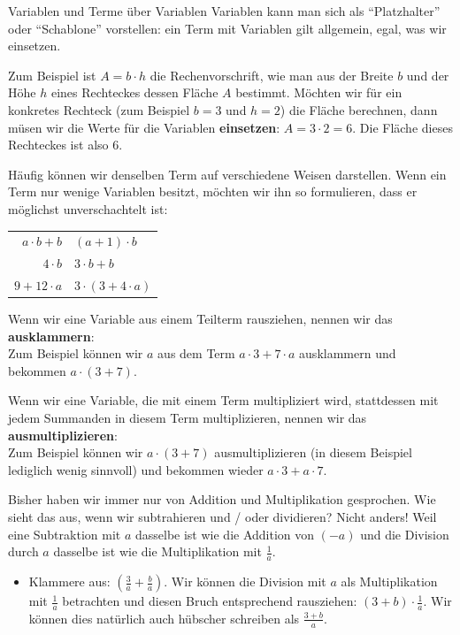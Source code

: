 \documentclass[../../main.tex]{subfiles}
\begin{document}
	\begin{nutshell}{Variablen und Terme über Variablen}
		Variablen kann man sich als \enquote{Platzhalter} oder \enquote{Schablone} vorstellen: ein Term mit Variablen gilt allgemein, egal, was wir einsetzen.

		Zum Beispiel ist $A = b\cdot h$ die Rechenvorschrift, wie man aus der Breite $b$ und der Höhe $h$ eines Rechteckes dessen Fläche $A$ bestimmt.
		Möchten wir für ein konkretes Rechteck (zum Beispiel $b=3$ und $h=2$) die Fläche berechnen, dann müsen wir die Werte für die Variablen \textbf{einsetzen}:
		$A = 3\cdot 2 = 6$. Die Fläche dieses Rechteckes ist also $6$.

		Häufig können wir denselben Term auf verschiedene Weisen darstellen. Wenn ein Term nur wenige Variablen besitzt, möchten wir ihn so formulieren,
		dass er möglichst unverschachtelt ist:
		\begin{center}
			\begin{tabular}{r@{ statt }l}
				$a\cdot b + b$ & $(a+1)\cdot b$\\
				$4\cdot b$ & $3\cdot b + b$\\
				$9+12\cdot a$ & $3\cdot (3 + 4\cdot a)$
			\end{tabular}
		\end{center}

		Wenn wir eine Variable aus einem Teilterm rausziehen, nennen wir das \textbf{ausklammern}:\\
		Zum Beispiel können wir $a$ aus dem Term $a\cdot 3+7\cdot a$ ausklammern und bekommen $a\cdot(3+7)$.

		Wenn wir eine Variable, die mit einem Term multipliziert wird, stattdessen mit jedem Summanden in diesem Term multiplizieren, nennen wir das \textbf{ausmultiplizieren}:\\
		Zum Beispiel können wir $a\cdot (3+7)$ ausmultiplizieren (in diesem Beispiel lediglich wenig sinnvoll) und bekommen wieder $a\cdot 3+ a\cdot 7$.
	\end{nutshell}

	Bisher haben wir immer nur von Addition und Multiplikation gesprochen. Wie sieht das aus, wenn wir subtrahieren und / oder dividieren?
	Nicht anders! Weil eine Subtraktion mit $a$ dasselbe ist wie die Addition von $(-a)$ und die Division durch $a$ dasselbe ist wie die Multiplikation mit $\frac{1}{a}$.
	\begin{example}{}
		\begin{itemize}
			\item Klammere aus: $\left(\frac{3}{a}+\frac{b}{a}\right)$. Wir können die Division mit $a$ als Multiplikation mit $\frac{1}{a}$ betrachten und diesen Bruch entsprechend rausziehen:
			$(3+b)\cdot \frac{1}{a}$. Wir können dies natürlich auch hübscher schreiben als $\frac{3+b}{a}$.
		\end{itemize}
	\end{example}
\end{document}

